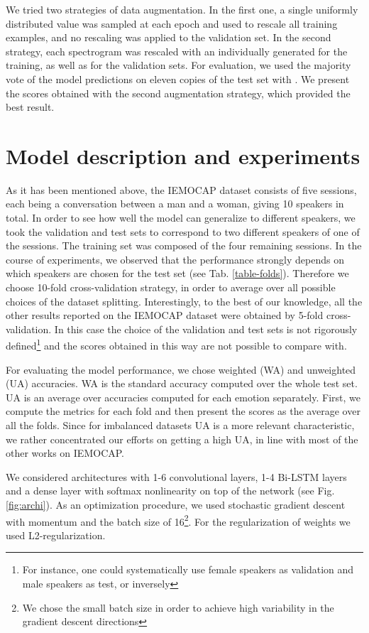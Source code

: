 \documentclass[a4paper]{article}
\begin{document}
We tried two strategies of data augmentation. In the first one, a single uniformly distributed value  was sampled at each epoch and used to 
rescale all training examples, and no rescaling was applied to the validation set. In the second strategy, each spectrogram was rescaled with an individually 
generated  for the training, as well as for the validation sets. For evaluation, we used the majority vote of the model predictions on eleven copies of 
the test set with . We present the scores obtained with the second augmentation strategy, which provided the best result.


\section{Model description and experiments}
\label{modexp}
As it has been mentioned above, the IEMOCAP dataset consists of five sessions, each being a conversation between a man and a woman, giving 10 speakers in total. 
In order to see how well the model can generalize to different speakers, we took the validation and test sets to correspond to two different speakers of one of the sessions. 
The training set was composed of the four remaining sessions.
In the course of experiments, we observed that the performance strongly depends on which speakers are chosen for the test set (see Tab. \ref{table-folds}). 
Therefore we choose 10-fold cross-validation strategy, in order to average over all possible choices of the dataset splitting. Interestingly, to the best of our knowledge, 
all the other results reported on the IEMOCAP dataset were obtained by 5-fold cross-validation. In this case the choice of the validation and test sets is not 
rigorously defined\footnote{For instance, one could systematically use female speakers as validation and male speakers as test, or inversely} and the scores 
obtained in this way are not possible to compare with.

For evaluating the model performance, we chose weighted (WA) and unweighted (UA) accuracies. WA is the standard accuracy computed over the whole test set. UA is an average over 
accuracies computed for each emotion separately. First, we compute the metrics for each fold and then present the scores as the average over all the folds.
Since for imbalanced datasets UA is a more relevant characteristic, we rather concentrated our efforts on getting a high UA, in line with most of the other works on IEMOCAP.

We considered architectures with 1-6 convolutional layers, 1-4 Bi-LSTM layers and a dense layer with softmax nonlinearity on top of the network (see Fig. \ref{fig:archi}). 
As an optimization procedure, we used stochastic gradient descent with momentum and the batch size of 16\footnote{We chose the small batch size in order to achieve high variability in the gradient descent directions}. For the regularization of weights we used L2-regularization.
\end{document}
